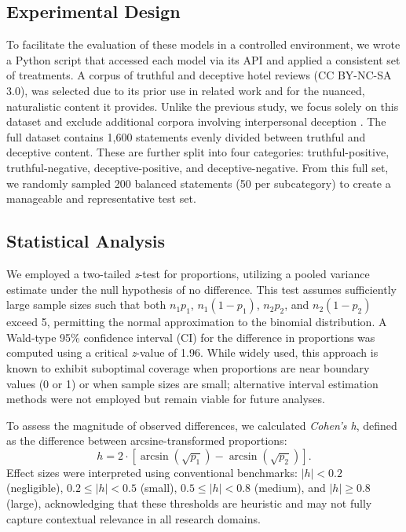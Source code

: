 \documentclass{article}
\begin{document}
\subsection{Experimental Design}

To facilitate the evaluation of these models in a controlled environment, we wrote a Python script that accessed each model via its API and applied a consistent set of treatments. A corpus of truthful and deceptive hotel reviews \citep{ott_finding_2011} (CC BY-NC-SA 3.0), was selected due to its prior use in related work \citep{markowitz_generative_2024} and for the nuanced, naturalistic content it provides. Unlike the previous study, we focus solely on this dataset and exclude additional corpora involving interpersonal deception \citep{markowitz_when_2020, lloyd_miami_2019}. The full dataset contains 1,600 statements evenly divided between truthful and deceptive content. These are further split into four categories: truthful-positive, truthful-negative, deceptive-positive, and deceptive-negative. From this full set, we randomly sampled 200 balanced statements (50 per subcategory) to create a manageable and representative test set.

\subsection{Statistical Analysis}

We employed a two-tailed \textit{z}-test for proportions, utilizing a pooled variance estimate under the null hypothesis of no difference. This test assumes sufficiently large sample sizes such that both $n_1p_1$, $n_1(1-p_1)$, $n_2p_2$, and $n_2(1-p_2)$ exceed 5, permitting the normal approximation to the binomial distribution. A Wald-type 95\% confidence interval (CI) for the difference in proportions was computed using a critical \textit{z}-value of 1.96. While widely used, this approach is known to exhibit suboptimal coverage when proportions are near boundary values (0 or 1) or when sample sizes are small; alternative interval estimation methods were not employed but remain viable for future analyses.

To assess the magnitude of observed differences, we calculated \textit{Cohen's h}, defined as the difference between arcsine-transformed proportions: 
\[
h = 2 \cdot \left[ \arcsin\left(\sqrt{p_1}\right) - \arcsin\left(\sqrt{p_2}\right) \right].
\]
Effect sizes were interpreted using conventional benchmarks: $|h| < 0.2$ (negligible), $0.2 \leq |h| < 0.5$ (small), $0.5 \leq |h| < 0.8$ (medium), and $|h| \geq 0.8$ (large), acknowledging that these thresholds are heuristic and may not fully capture contextual relevance in all research domains.
\end{document}
